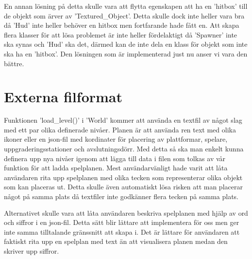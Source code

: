 \documentclass{TDP005mall}
\begin{document}
En annan lösning på detta skulle vara att flytta egenskapen att ha en 'hitbox' till de objekt som ärver av 'Textured\_Object'. Detta skulle dock inte heller vara bra då 'Hud' inte heller behöver en hitbox men fortfarande hade fått en. Att skapa flera klasser för att lösa problemet är inte heller fördelaktigt då 'Spawner' inte ska synas och 'Hud' ska det, därmed kan de inte dela en klass för objekt som inte ska ha en 'hitbox'. Den lösningen som är implementerad just nu anser vi vara den bättre.

\section{Externa filformat} 
Funktionen 'load\_level()' i 'World' kommer att använda en textfil av något slag med ett par olika definerade nivåer. Planen är att använda ren text med olika ikoner eller en json-fil med kordinater för placering av plattformar, spelare, uppgraderingsstationer och avslutningsdörr. Med detta så ska man enkelt kunna definera upp nya nivåer igenom att lägga till data i filen som tolkas av vår funktion för att ladda spelplanen. Mest användarvänligt hade varit att låta användaren rita upp spelplanen med olika tecken som representerar olika objekt som kan placeras ut. Detta skulle även automatiskt lösa risken att man placerar något på samma plats då textfiler inte godkänner flera tecken på samma plats.

Alternativet skulle vara att låta användaren beskriva spelplanen med hjälp av ord och siffror i en json-fil. Detta sätt blir lättare att implementera för oss men ger inte samma tilltalande gränssnitt att skapa i. Det är lättare för användaren att faktiskt rita upp en spelplan med text än att visualisera planen medan den skriver upp siffror.
\end{document}

